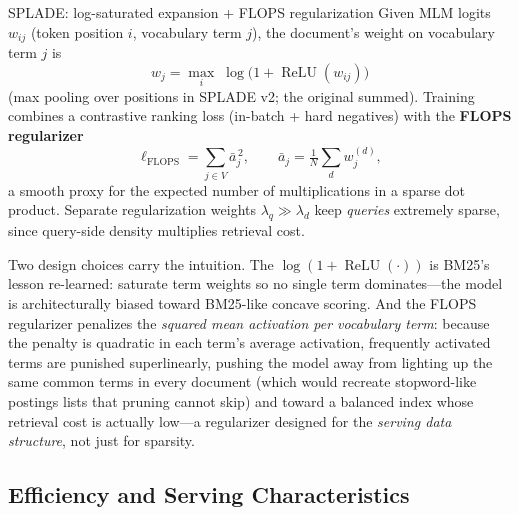 \begin{mathresult}{SPLADE: log-saturated expansion + FLOPS regularization}
Given MLM logits $w_{ij}$ (token position $i$, vocabulary term $j$), the document's weight on vocabulary term $j$ is
\begin{equation}
w_j = \max_{i} \; \log\bigl(1 + \operatorname{ReLU}(w_{ij})\bigr)
\label{sr:eq:splade}
\end{equation}
(max pooling over positions in SPLADE v2; the original summed). Training combines a contrastive ranking loss (in-batch + hard negatives) with the \textbf{FLOPS regularizer}
\begin{equation}
\ell_{\text{FLOPS}} = \sum_{j \in V} \bar{a}_j^{\,2}, \qquad \bar{a}_j = \tfrac{1}{N}\sum_{d} w_j^{(d)},
\label{sr:eq:flops}
\end{equation}
a smooth proxy for the expected number of multiplications in a sparse dot product. Separate regularization weights $\lambda_q \gg \lambda_d$ keep \emph{queries} extremely sparse, since query-side density multiplies retrieval cost.
\end{mathresult}

Two design choices carry the intuition. The $\log(1+\operatorname{ReLU}(\cdot))$ is BM25's lesson re-learned: saturate term weights so no single term dominates---the model is architecturally biased toward BM25-like concave scoring. And the FLOPS regularizer penalizes the \emph{squared mean activation per vocabulary term}: because the penalty is quadratic in each term's average activation, frequently activated terms are punished superlinearly, pushing the model away from lighting up the same common terms in every document (which would recreate stopword-like postings lists that pruning cannot skip) and toward a balanced index whose retrieval cost is actually low---a regularizer designed for the \emph{serving data structure}, not just for sparsity.

\subsection{Efficiency and Serving Characteristics}

